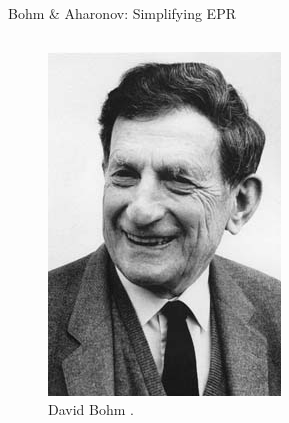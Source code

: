 \begin{frame}{Bohm \& Aharonov: Simplifying EPR}
\begin{columns}[T]
    \begin{column}{0.4\textwidth}
      \begin{figure}
        \centering
        \includegraphics[width=\linewidth, height=0.7\textheight, keepaspectratio]{images/David_Bohm.jpg}
        \caption{David Bohm \cite{Anon_Bohm}.}
      \end{figure}
    \end{column}
  \end{columns}
\end{frame}

